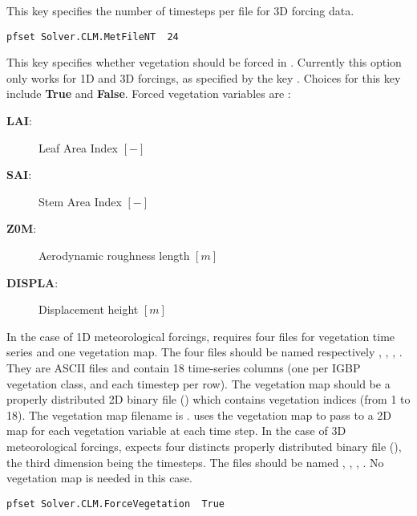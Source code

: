 {This key specifies the number of timesteps per file for 3D forcing data.
}
\begin{display}\begin{verbatim}
pfset Solver.CLM.MetFileNT	24
\end{verbatim}\end{display}

{This key specifies whether vegetation should be forced in . Currently this option only works for 1D and 3D forcings, as specified by the key . Choices for this key include {\bf True} and {\bf False}. Forced vegetation variables are :
\begin{description}
\item[{\bf LAI}: ] Leaf Area Index $[-]$
\item[{\bf SAI}: ] Stem Area Index $[-]$
\item[{\bf Z0M}: ] Aerodynamic roughness length $[m]$
\item[{\bf DISPLA}: ] Displacement height $[m]$
\label{clm_forcing}
\end{description}
In the case of 1D meteorological forcings,  requires four files for vegetation time series and one vegetation map. The four files should be named respectively , , , . They are ASCII files and contain 18 time-series columns (one per IGBP vegetation class, and each timestep per row). The vegetation map should be a properly distributed 2D \parflow{} binary file () which contains vegetation indices (from 1 to 18). The vegetation map filename is . \parflow{} uses the vegetation map to pass to  a 2D map for each vegetation variable at each time step.
In the case of 3D meteorological forcings, \parflow{} expects four distincts properly distributed \parflow{} binary file (), the third dimension being the timesteps. The files should be named , , , . No vegetation map is needed in this case.
}
\begin{display}\begin{verbatim}
pfset Solver.CLM.ForceVegetation  True
\end{verbatim}\end{display}

